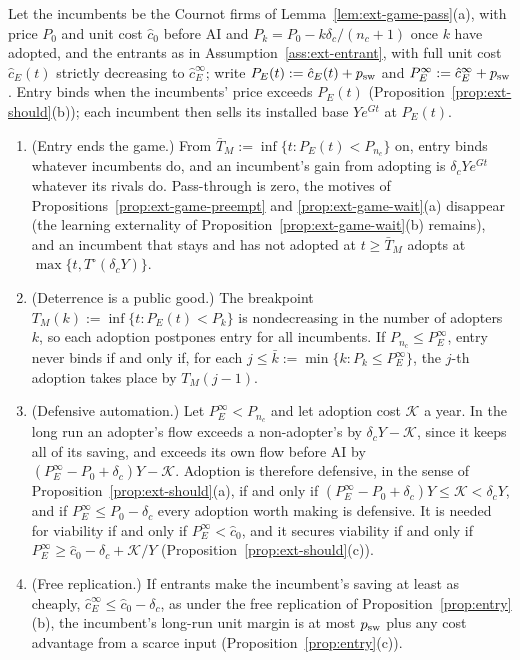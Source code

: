 \begin{proposition}\label{prop:ext-game-entry}
Let the incumbents be the Cournot firms of Lemma~\ref{lem:ext-game-pass}(a), with price $P_0$ and unit cost $\hat c_0$ before AI and $P_k=P_0-k\delta_c/(n_c+1)$ once $k$ have adopted, and the entrants as in Assumption~\ref{ass:ext-entrant}, with full unit cost $\hat c_E(t)$ strictly decreasing to $\hat c_E^\infty$; write $P_E(t):=\hat c_E(t)+p_{\rm sw}$ and $P_E^\infty:=\hat c_E^\infty+p_{\rm sw}$. Entry binds when the incumbents' price exceeds $P_E(t)$ (Proposition~\ref{prop:ext-should}(b)); each incumbent then sells its installed base $Ye^{Gt}$ at $P_E(t)$.
\begin{enumerate}
\item[(a)] (Entry ends the game.) From $\bar T_M:=\inf\{t:P_E(t)<P_{n_c}\}$ on, entry binds whatever incumbents do, and an incumbent's gain from adopting is $\delta_cYe^{Gt}$ whatever its rivals do. Pass-through is zero, the motives of Propositions~\ref{prop:ext-game-preempt} and \ref{prop:ext-game-wait}(a) disappear (the learning externality of Proposition~\ref{prop:ext-game-wait}(b) remains), and an incumbent that stays and has not adopted at $t\ge\bar T_M$ adopts at $\max\{t,T^\circ(\delta_cY)\}$.
\item[(b)] (Deterrence is a public good.) The breakpoint $T_M(k):=\inf\{t:P_E(t)<P_k\}$ is nondecreasing in the number of adopters $k$, so each adoption postpones entry for all incumbents. If $P_{n_c}\le P_E^\infty$, entry never binds if and only if, for each $j\le\bar k:=\min\{k:P_k\le P_E^\infty\}$, the $j$-th adoption takes place by $T_M(j-1)$.
\item[(c)] (Defensive automation.) Let $P_E^\infty<P_{n_c}$ and let adoption cost $\mathcal K$ a year. In the long run an adopter's flow exceeds a non-adopter's by $\delta_cY-\mathcal K$, since it keeps all of its saving, and exceeds its own flow before AI by $(P_E^\infty-P_0+\delta_c)Y-\mathcal K$. Adoption is therefore defensive, in the sense of Proposition~\ref{prop:ext-should}(a), if and only if $(P_E^\infty-P_0+\delta_c)Y\le\mathcal K<\delta_cY$, and if $P_E^\infty\le P_0-\delta_c$ every adoption worth making is defensive. It is needed for viability if and only if $P_E^\infty<\hat c_0$, and it secures viability if and only if $P_E^\infty\ge\hat c_0-\delta_c+\mathcal K/Y$ (Proposition~\ref{prop:ext-should}(c)).
\item[(d)] (Free replication.) If entrants make the incumbent's saving at least as cheaply, $\hat c_E^\infty\le\hat c_0-\delta_c$, as under the free replication of Proposition~\ref{prop:entry}(b), the incumbent's long-run unit margin is at most $p_{\rm sw}$ plus any cost advantage from a scarce input (Proposition~\ref{prop:entry}(c)).
\end{enumerate}
\end{proposition}

